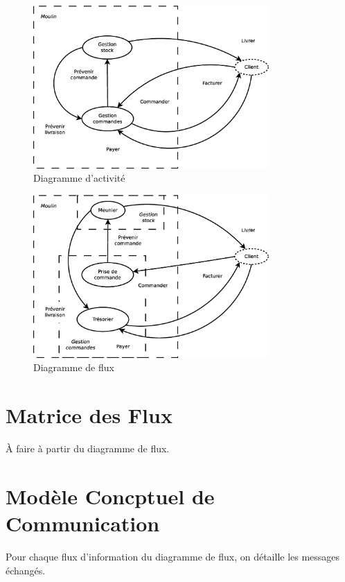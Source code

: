 \begin{figure}[!htb]
    \begin{center}
    \includegraphics[width=9cm]{images/cc1_df2.eps}
    \caption{\label{cc1_df2} Diagramme d'activité}
    \end{center}
\end{figure}

\begin{figure}[!htb]
    \begin{center}
    \includegraphics[width=9cm]{images/cc1_df3.eps}
    \caption{\label{cc1_df3} Diagramme de flux}
    \end{center}
\end{figure}

\section*{Matrice des Flux}

À faire à partir du diagramme de flux.

\newpage
\section*{Modèle Concptuel de Communication}

Pour chaque flux d'information du diagramme de flux, on détaille les messages échangés.

